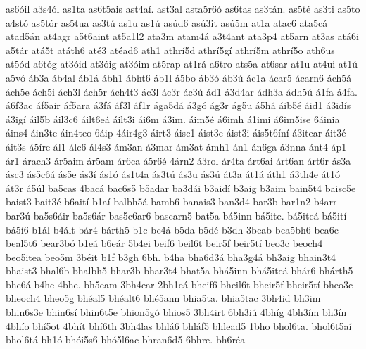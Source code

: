 {as6^^f3il
a3s4^^f3l
as1ta
as6t5ais
ast4a^^ed.
ast3al
asta5r6^^f3
as6tas
as3t^^e1n.
as5t^^e9
as3ti
as5to
a4st^^f3
as5t^^f3r
as5tua
as3t^^fa
as1u
as1^^fa
as^^fad6
as^^fa3it
as^^fa5m
at1a
atac6
ata5c^^e1
atad5^^e1n
at4agr
a5t6aint
at5a1l2
ata3m
atam4^^e1
a3t4ant
ata3p4
at5arn
at3as
at^^e16i
a5t^^e1r
at^^e15t
at^^e1th6
at^^e93
at^^e9ad6
ath1
athr^^ed5d
athr^^ed5g^^ed
athr^^ed5m
athr^^ed5o
ath6us
at5^^f3d
a6t^^f3g
at3^^f3id
at3^^f3ig
at3^^f3im
at5rap
at1r^^e1
a6tro
ats5a
at6sar
at1u
at4ui
at1^^fa
a5v^^f3
^^e1b3a
^^e1b4al
^^e1b1^^e1
^^e1bh1
^^e1bht6
^^e1b1l
^^e15bo
^^e1b3^^f3
^^e1b3^^fa
^^e1c1a
^^e1car5
^^e1carn6
^^e1ch5^^e1
^^e1ch5e
^^e1ch5i
^^e1ch3l
^^e1ch5r
^^e1ch4t3
^^e1c3l
^^e1c3r
^^e1c3^^fa
^^e1d1
^^e13d4ar
^^e1dh3a
^^e1dh5^^fa
^^e11fa
^^e14fa.
^^e16f3ac
^^e1f5air
^^e1f5ara
^^e13f^^e1
^^e1f3l
^^e1f1r
^^e1ga5d^^e1
^^e13g^^f3
^^e1g3r
^^e1g5u
^^e15h^^e1
^^e1ib5^^e9
^^e1id1
^^e13id^^eds
^^e13ig^^ed
^^e1il5b
^^e1il3c6
^^e1ilt6e^^e1
^^e1ilt3i
^^e1i6m
^^e13im.
^^e1im5^^e9
^^e16imh
^^e11imi
^^e16im5ise
6^^e1inia
^^e1ins4
^^e1in3te
^^e1in4teo
6^^e1ip
4^^e1ir4g3
^^e1irt3
^^e1isc1
^^e1ist3e
^^e1ist3i
^^e1is5t6^^edn^^ed
^^e13itear
^^e1it3^^e9
^^e1it3s
^^e15^^edre
^^e1l1
^^e1lc6
^^e1l4s3
^^e1m3an
^^e13mar
^^e1m3at
^^e1mh1
^^e1n1
^^e1n6ga
^^e13nna
^^e1nt4
^^e1p1
^^e1r1
^^e1rach3
^^e1r5aim
^^e1r5am
^^e1r6ca
^^e15r6^^e9
4^^e1rn2
^^e13rol
^^e1r4ta
^^e1rt6ai
^^e1rt6an
^^e1rt6r
^^e1s3a
^^e1sc3
^^e1s5c6^^e1
^^e1s5e
^^e1s3^^ed
^^e1s1^^f3
^^e1s1t4a
^^e1s3t^^fa
^^e1s3u
^^e1s3^^fa
^^e1t3a
^^e1t1^^e1
^^e1th1
^^e13th4e
^^e1t1^^f3
^^e1t3r
^^e15^^fal
ba5cas
4bac^^e1
bac6s5
b5adar
ba3d^^e1i
b3aid^^ed
b3aig
b3aim
bain5t4
baisc5e
baist3
bait3^^e9
b6ait^^ed
b1a^^ed
balbh5^^e1
bamb6
banais3
ban3d4
bar3b
bar1n2
b4arr
bar3^^fa
ba5s6^^e1ir
ba5s6^^e1r
bas5c6ar6
bascarn5
bat5a
b^^e15inn
b^^e15ite.
b^^e15ite^^e1
b^^e15it^^ed
b^^e15^^ed6
b1^^e1l
b4^^e1lt
b^^e1r4
b^^e1rth5
b1c
bc4^^e1
b5da
b5d^^e9
b3dh
3beab
bea5bh6
bea6c
beal5t6
bear3b^^f3
b1e^^e1
b6e^^e1r
5b4ei
beif6
beil6t
beir5f
beir5t^^ed
beo3c
beoch4
beo5itea
beo5m
3b^^e9it
b1f
b3gh
6bh.
b4ha
bha6d3^^e1
bha3g4^^e1
bh3aig
bhain3t4
bhaist3
bhal6b
bhalbh5
bhar3b
bhar3t4
bhat5a
bh^^e15inn
bh^^e15ite^^e1
bh^^e1r6
bh^^e1rth5
bhc6^^e1
b4he
4bhe.
bh5eam
3bh4ear
2bh1e^^e1
bheif6
bheil6t
bheir5f
bheir5t^^ed
bheo3c
bheoch4
bheo5g
bh^^e9al5
bh^^e9alt6
bh^^e95ann
bhia5ta.
bhia5tac
3bh4id
bh3im
bhin6s3e
bhin6s^^ed
bhin6t5e
bhion5g^^f3
bhios5
3bh4irt
6bh3i^^fa
4bh^^edg
4bh3^^edm
bh3^^edn
4bh^^edo
bh^^ed5ot
4bh^^edt
bh^^ed6th
3bh4las
bhl^^e16
bhl^^e1f5
bhlead5
1bho
bhol6ta.
bhol6t5a^^ed
bhol6t^^e1
bh1^^f3
bh^^f3i5s6
bh^^f35l6ac
bhran6d5
6bhre.
bh6r^^e9a
}
